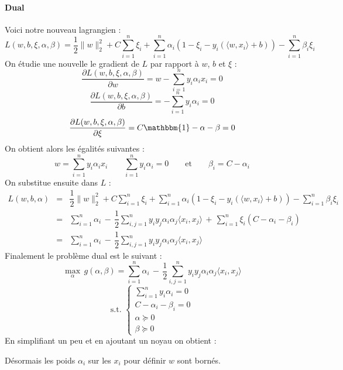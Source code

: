 \paragraph{Dual}
Voici notre nouveau lagrangien :
$$ L(w, b, \xi, \alpha, \beta) = \dfrac{1}{2} \| w \|_2^2 + C \sum_{i = 1}^n \xi_i + \sum_{i=1}^{n} \alpha_i \left( 1 - \xi_i - y_i \left( \langle w, x_i \rangle + b \right) \right) - \sum_{i = 1}^n \beta_i \xi_i $$
On étudie une nouvelle le gradient de $L$ par rapport à $w$, $b$ et $\xi$ :
$$ \dfrac{\partial L(w, b, \xi, \alpha, \beta)}{\partial w} = w - \sum_{i = 1}^{n} y_i \alpha_i x_i = 0 $$
$$ \dfrac{\partial L(w, b, \xi, \alpha, \beta)}{\partial b} = - \sum_{i = 1}^{n} y_i \alpha_i = 0 $$
$$ \dfrac{\partial L(w, b, \xi, \alpha, \beta)}{\partial \xi} = C \mathbbm{1} - \alpha - \beta = 0 $$
On obtient alors les égalités suivantes :
$$ w = \sum_{i = 1}^{n} y_i \alpha_i x_i \qquad \sum_{i = 1}^{n} y_i \alpha_i = 0 \qquad \text{et} \qquad \beta_i = C - \alpha_i $$
On substitue ensuite dans $L$ :
$$ \begin{array}{lll}
L(w, b, \alpha)
& = & \displaystyle \dfrac{1}{2} \| w \|_2^2 + C \sum_{i = 1}^n \xi_i + \sum_{i=1}^{n} \alpha_i \left( 1 - \xi_i - y_i \left( \langle w, x_i \rangle + b \right) \right) - \sum_{i = 1}^n \beta_i \xi_i \\
& = & \displaystyle \sum_{i=1}^{n} \alpha_i \, - \, \dfrac{1}{2} \sum_{i, j = 1}^n y_i y_j \alpha_i \alpha_j \langle x_i, x_j \rangle \, + \, \sum_{i = 1}^n \xi_i \left( C - \alpha_i - \beta_i \right) \\
& = & \displaystyle \sum_{i=1}^{n} \alpha_i \, - \, \dfrac{1}{2} \sum_{i, j = 1}^n y_i y_j \alpha_i \alpha_j \langle x_i, x_j \rangle
\end{array} $$
Finalement le problème dual est le suivant :
$$ \max_\alpha \, g(\alpha, \beta) = \sum_{i=1}^{n} \alpha_i \, - \, \dfrac{1}{2} \sum_{i, j = 1}^n y_i y_j \alpha_i \alpha_j \langle x_i, x_j \rangle $$
\vspace{-3mm}
$$ \text{s.t. } \left\{ \begin{array}{l}
\sum_{i=1}^{n} y_i \alpha_i = 0 \\
C - \alpha_i - \beta_i = 0 \\
\alpha \succeq 0 \\
\beta \succeq 0
\end{array} \right. $$
En simplifiant un peu et en ajoutant un noyau on obtient :
\begin{center}
\end{center}
Désormais les poids $\alpha_i$ sur les $x_i$ pour définir $w$ sont bornés.